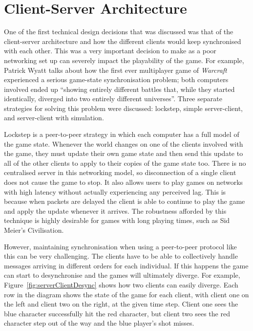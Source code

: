 \section{Client-Server Architecture}

One of the first technical design decisions that was discussed was that of the client-server architecture and how the different clients would keep synchronised with each other. This was a very important decision to make as a poor networking set up can severely impact the playability of the game. For example, Patrick Wyatt talks about how the first ever multiplayer game of \emph{Warcraft} experienced a serious game-state synchronisation problem; both computers involved ended up ``showing entirely different battles that, while they started identically, diverged into two entirely different universes''.\cite{wyatt2012warcraft} Three separate strategies for solving this problem were discussed: lockstep, simple server-client, and server-client with simulation.

Lockstep is a peer-to-peer strategy in which each computer has a full model of the game state. Whenever the world changes on one of the clients involved with the game, they must update their own game state and then send this update to all of the other clients to apply to their copies of the game state too. There is no centralised server in this networking model, so disconnection of a single client does not cause the game to stop. It also allows users to play games on networks with high latency without actually experiencing any perceived lag. This is because when packets are delayed the client is able to continue to play the game and apply the update whenever it arrives. The robustness afforded by this technique is highly desirable for games with long playing times, such as Sid Meier's Civilisation.

However, maintaining synchronisation when using a peer-to-peer protocol like this can be very challenging. The clients have to be able to collectively handle messages arriving in different orders for each individual. If this happens the game can start to desynchronise and the games will ultimately diverge. For example, Figure~\ref{fig:serverClientDesync} shows how two clients can easily diverge. Each row in the diagram shows the state of the game for each client, with client one on the left and client two on the right, at the given time step. Client one sees the blue character successfully hit the red character, but client two sees the red character step out of the way and the blue player's shot misses.


